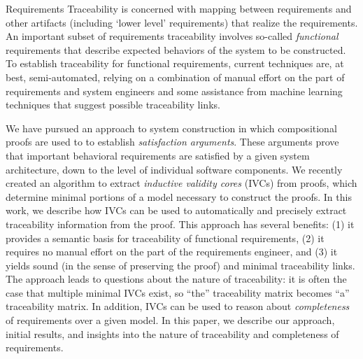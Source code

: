 





Requirements Traceability is concerned with mapping between requirements and other artifacts (including `lower level' requirements) that realize the requirements. An important subset of requirements traceability involves so-called {\em functional} requirements that describe expected behaviors of the system to be constructed.  To establish traceability for functional requirements, current techniques are, at best, semi-automated, relying on a combination of manual effort on the part of requirements and system engineers and some assistance from machine learning techniques that suggest possible traceability links.

We have pursued an approach to system construction in which compositional proofs are used to to establish {\em satisfaction arguments}.  These arguments prove that important behavioral requirements are satisfied by a given system architecture, down to the level of individual software components.  We recently created an algorithm to extract {\em inductive validity cores} (IVCs) from proofs, which determine minimal portions of a model necessary to construct the proofs.  In this work, we describe how IVCs can be used to automatically and precisely extract traceability information from the proof.  This approach has several benefits: (1) it provides a semantic basis for traceability of functional requirements, (2) it requires no manual effort on the part of the requirements engineer, and (3) it yields sound (in the sense of preserving the proof) and minimal traceability links.  The approach leads to questions about the nature of traceability: it is often the case that multiple minimal IVCs exist, so ``the'' traceability matrix becomes ``a'' traceability matrix.  In addition, IVCs can be used to reason about {\em completeness} of requirements over a given model.  In this paper, we describe our approach, initial results, and insights into the nature of traceability and completeness of requirements.

